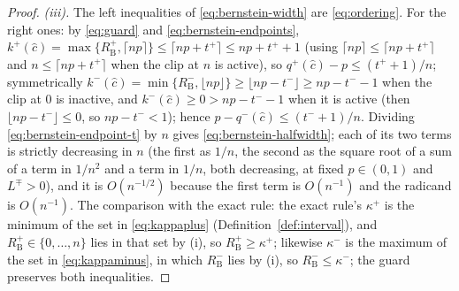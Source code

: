 \begin{proof}
\emph{(iii).} The left inequalities of \eqref{eq:bernstein-width} are
\eqref{eq:ordering}. For the right ones: by \eqref{eq:guard} and
\eqref{eq:bernstein-endpoints}, $k^{+}(\hat c)=\max\{R^{+}_{\mathrm{B}},
\lceil np\rceil\}\le\lceil np+t^{+}\rceil\le np+t^{+}+1$ (using
$\lceil np\rceil\le\lceil np+t^{+}\rceil$ and $n\le\lceil np+t^{+}\rceil$
when the clip at $n$ is active), so $q^{+}(\hat c)-p\le(t^{+}+1)/n$;
symmetrically $k^{-}(\hat c)=\min\{R^{-}_{\mathrm{B}},\lfloor np\rfloor\}
\ge\lfloor np-t^{-}\rfloor\ge np-t^{-}-1$ when the clip at $0$ is inactive,
and $k^{-}(\hat c)\ge0>np-t^{-}-1$ when it is active (then
$\lfloor np-t^{-}\rfloor\le0$, so $np-t^{-}<1$); hence
$p-q^{-}(\hat c)\le(t^{-}+1)/n$. Dividing \eqref{eq:bernstein-endpoint-t} by
$n$ gives \eqref{eq:bernstein-halfwidth}; each of its two terms is strictly
decreasing in $n$ (the first as $1/n$, the second as the square root of a sum
of a term in $1/n^{2}$ and a term in $1/n$, both decreasing, at fixed
$p\in(0,1)$ and $L^{\mp}>0$), and it is $O(n^{-1/2})$ because the first term
is $O(n^{-1})$ and the radicand is $O(n^{-1})$. The comparison with the exact
rule: the exact rule's $\kappa^{+}$ is the minimum of the set in
\eqref{eq:kappaplus} (Definition~\ref{def:interval}), and
$R^{+}_{\mathrm{B}}\in\{0,\dots,n\}$ lies in that set by (i), so
$R^{+}_{\mathrm{B}}\ge\kappa^{+}$; likewise $\kappa^{-}$ is the maximum of the
set in \eqref{eq:kappaminus}, in which $R^{-}_{\mathrm{B}}$ lies by (i), so
$R^{-}_{\mathrm{B}}\le\kappa^{-}$; the guard preserves both inequalities.
\end{proof}

